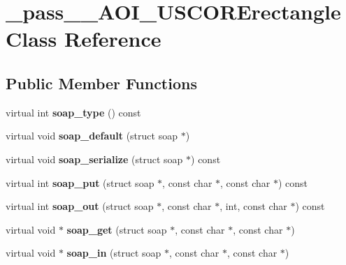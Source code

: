 \hypertarget{class__pass____AOI__USCORErectangle}{
\section{\_\-pass\_\-\_\-AOI\_\-USCORErectangle Class Reference}
\label{class__pass____AOI__USCORErectangle}
}
\subsection*{Public Member Functions}
\begin{DoxyCompactItemize}
\item 
\hypertarget{class__pass____AOI__USCORErectangle_af53058dbf70249d44b496e290a504391}{
virtual int {\bfseries soap\_\-type} () const }
\label{class__pass____AOI__USCORErectangle_af53058dbf70249d44b496e290a504391}

\item 
\hypertarget{class__pass____AOI__USCORErectangle_ae1cd181e8d1b62482975bb95128af8fa}{
virtual void {\bfseries soap\_\-default} (struct soap $\ast$)}
\label{class__pass____AOI__USCORErectangle_ae1cd181e8d1b62482975bb95128af8fa}

\item 
\hypertarget{class__pass____AOI__USCORErectangle_aac7a50072bcfcba5aed5fc3d2afd55ff}{
virtual void {\bfseries soap\_\-serialize} (struct soap $\ast$) const }
\label{class__pass____AOI__USCORErectangle_aac7a50072bcfcba5aed5fc3d2afd55ff}

\item 
\hypertarget{class__pass____AOI__USCORErectangle_ad96f162430edbf03c3031a907e11e37b}{
virtual int {\bfseries soap\_\-put} (struct soap $\ast$, const char $\ast$, const char $\ast$) const }
\label{class__pass____AOI__USCORErectangle_ad96f162430edbf03c3031a907e11e37b}

\item 
\hypertarget{class__pass____AOI__USCORErectangle_af0d1719049b2f93495c01f8bf73604f7}{
virtual int {\bfseries soap\_\-out} (struct soap $\ast$, const char $\ast$, int, const char $\ast$) const }
\label{class__pass____AOI__USCORErectangle_af0d1719049b2f93495c01f8bf73604f7}

\item 
\hypertarget{class__pass____AOI__USCORErectangle_ab37df7b13676bd5bbde588ae5077b222}{
virtual void $\ast$ {\bfseries soap\_\-get} (struct soap $\ast$, const char $\ast$, const char $\ast$)}
\label{class__pass____AOI__USCORErectangle_ab37df7b13676bd5bbde588ae5077b222}

\item 
\hypertarget{class__pass____AOI__USCORErectangle_a9732c1e29957bf47569a8ddcc9cdcae0}{
virtual void $\ast$ {\bfseries soap\_\-in} (struct soap $\ast$, const char $\ast$, const char $\ast$)}
\label{class__pass____AOI__USCORErectangle_a9732c1e29957bf47569a8ddcc9cdcae0}

\end{DoxyCompactItemize}
